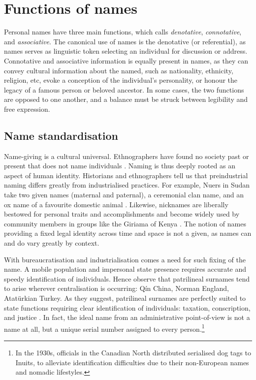 \section{Functions of names}

Personal names have three main functions, which \textcite[392]{heymann11} calls
\textit{denotative}, \textit{connotative}, and \textit{associative}. The
canonical use of names is the denotative (or referential), as names serves as
linguistic token selecting an individual for discussion or address.
Connotative and associative information is equally present in names, as they
can convey cultural information about the named, such as nationality,
ethnicity, religion, etc, evoke a conception of the individual's personality,
or honour the legacy of a famous person or beloved ancestor. In some cases, the
two functions are opposed to one another, and a balance must be struck between
legibility and free expression.

\subsection{Name standardisation}

Name-giving is a cultural universal. Ethnographers have found no society past
or present that does not name individuals \parencite{alford87}. Naming is thus
deeply rooted as an aspect of human identity. Historians and ethnographers tell
us that preindustrial naming differs greatly from industrialised practices.
For example, Nuers in Sudan take two given names (maternal and paternal), a
ceremonial clan name, and an ox name of a favourite domestic animal
\parencite{wardhaugh92}. Likewise, nicknames are liberally bestowed for
personal traits and accomplishments and become widely used by community members
in groups like the Giriama of Kenya \parencite{parkin88}
\parencite{wardhaugh92}. The notion of names providing a fixed legal identity
across time and space is not a given, as names can and do vary greatly by
context.

With bureaucratisation and industrialisation comes a need for such fixing of
the name. A mobile population and impersonal state presence requires accurate
and speedy identification of individuals. Hence \textcite{scott02} observe that
patrilineal surnames tend to arise wherever centralisation is occurring: Qín
China, Norman England, Atatürkian Turkey. As they suggest, patrilineal surnames
are perfectly suited to state functions requiring clear identification of
individuals: taxation, conscription, and justice \parencite[18]{scott02}. In
fact, the ideal name from an administrative point-of-view is not a name at all,
but a unique serial number assigned to every person.\footnote{In the 1930s,
officials in the Canadian North distributed serialised dog tags to Inuits, to
alleviate identification difficulties due to their non-European names and
nomadic lifestyles.\parencite{scott02}}

